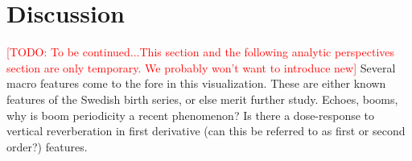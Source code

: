 \documentclass{article}
\newcommand\todo[1]{\textcolor{red}{[TODO: #1]}}
\begin{document}


\section{Discussion}
\todo{To be continued...This section and the following analytic perspectives section are only temporary. We probably won't want to introduce new}
Several macro features come to the fore in this visualization. These are either known features of the Swedish birth series, or else merit further study. Echoes, booms, why is boom periodicity a recent phenomenon? Is there a dose-response to vertical reverberation in first derivative (can this be referred to as first or second order?) features.
\end{document}
